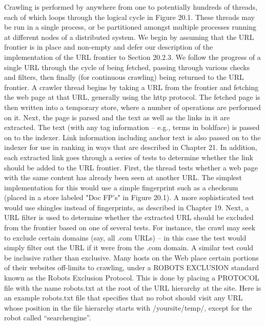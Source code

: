 Crawling is performed by anywhere from one to potentially hundreds of
threads, each of which loops through the logical cycle in Figure 20.1. These
threads may be run in a single process, or be partitioned amongst multiple
processes running at different nodes of a distributed system. We begin by
assuming that the URL frontier is in place and non-empty and defer our description
of the implementation of the URL frontier to Section 20.2.3. We
follow the progress of a single URL through the cycle of being fetched, passing
through various checks and filters, then finally (for continuous crawling)
being returned to the URL frontier.
A crawler thread begins by taking a URL from the frontier and fetching
the web page at that URL, generally using the http protocol. The fetched
page is then written into a temporary store, where a number of operations
are performed on it. Next, the page is parsed and the text as well as the
links in it are extracted. The text (with any tag information – e.g., terms in
boldface) is passed on to the indexer. Link information including anchor text
is also passed on to the indexer for use in ranking in ways that are described
in Chapter 21. In addition, each extracted link goes through a series of tests
to determine whether the link should be added to the URL frontier.
First, the thread tests whether a web page with the same content has already
been seen at another URL. The simplest implementation for this would
use a simple fingerprint such as a checksum (placed in a store labeled "Doc
FP’s" in Figure 20.1). A more sophisticated test would use shingles instead
of fingerprints, as described in Chapter 19.
Next, a URL filter is used to determine whether the extracted URL should
be excluded from the frontier based on one of several tests. For instance, the
crawl may seek to exclude certain domains (say, all .com URLs) – in this case
the test would simply filter out the URL if it were from the .com domain.
A similar test could be inclusive rather than exclusive. Many hosts on the
Web place certain portions of their websites off-limits to crawling, under a
ROBOTS EXCLUSION standard known as the Robots Exclusion Protocol. This is done by placing a
PROTOCOL file with the name robots.txt at the root of the URL hierarchy at the site. Here
is an example robots.txt file that specifies that no robot should visit any URL
whose position in the file hierarchy starts with /yoursite/temp/, except for the
robot called “searchengine”.

